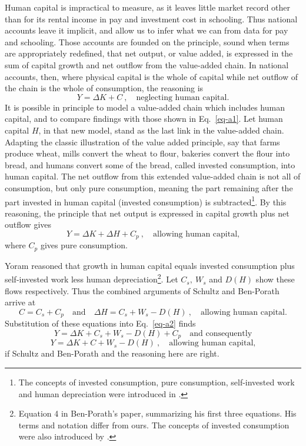\documentclass[a4paper,fleqn]{latex_styles/cas-sc}
\begin{document}
Human capital is impractical to measure, as it leaves little market
record other than for its rental income in pay and investment cost in schooling. Thus national accounts
leave it implicit, and allow us to infer what we can from data for pay and schooling. Those
accounts are founded on the principle, sound when terms are appropriately redefined, that net output,
or value added, is expressed in the sum of capital growth and net
outflow from the value-added chain. In national accounts, then, where
physical capital is the whole of capital while net outflow of the chain
is the whole of consumption, the reasoning is
%
\begin{equation}
Y = \Delta K + C \ , \quad \text{neglecting human capital.}\label{eq-a1}
\end{equation}
%
It is possible in principle to model a value-added chain which includes human
capital, and to compare findings with those shown in Eq.~\eqref{eq-a1}.
Let human capital $H$, in that new model, stand as the last link in the
value-added chain. Adapting the classic illustration of the value added
principle, say that farms produce wheat, mills convert the wheat to
flour, bakeries convert the flour into bread, and humans convert some of
the bread, called invested consumption, into human capital. The net
outflow from this extended value-added chain is not all of consumption,
but only pure consumption, meaning the part remaining after the part invested in human capital (invested consumption) is
subtracted\footnote{The concepts of invested consumption, pure consumption, self-invested work and human depreciation were introduced in \cite{schultzInvestmentHumanCapital1961}.}. By this reasoning, the principle
that net output is expressed in capital growth plus net outflow gives
%
\begin{equation} 
Y = \Delta K + \Delta H + C_{p}\ , \quad \text{allowing human capital,}\label{eq-a2} 
\end{equation}
%
where \(C_{p}\) gives pure consumption.

Yoram \citet{ben-porathProductionHumanCapital1967} reasoned
that growth in human capital equals invested consumption plus
self-invested work less human depreciation\footnote{Equation 4 in
  Ben-Porath's paper, summarizing his first three equations. His terms and
  notation differ from ours. The concepts of invested consumption were
  also introduced by \citet{schultzInvestmentHumanCapital1961}.}.
Let \(C_{s},\ W_{s}\) and \(D(H)\) show these flows respectively.
Thus the combined arguments of Schultz and Ben-Porath arrive at
%
\begin{equation}
C = C_{s} + C_{p} \quad \text{and}
\quad \Delta H = C_{s} + W_{s} - D(H)\ , \quad \text{allowing human capital.}\label{eq-a3}
\end{equation}
%
Substitution of these equations into Eq.~\eqref{eq-a2} finds
%
\[Y = \Delta K + C_{s} + W_{s} - D(H) + C_{p} \quad \text{and consequently}\]
%
\vspace{-5ex}
\begin{equation}
    Y = \Delta K + C + W_{s} - D(H)\ , \quad \text{allowing human capital,}\label{eq-a4}
\end{equation}
%
if Schultz and Ben-Porath and the reasoning here are right.
\end{document}
